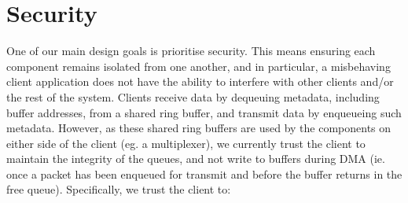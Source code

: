 \section{Security}
One of our main design goals is prioritise security. This means ensuring each component remains isolated from one another, and in particular, a
misbehaving client application does not have the ability to interfere with other clients and/or the rest of the system. Clients receive
data by dequeuing metadata, including buffer addresses, from a shared ring buffer, and transmit data by enqueueing such metadata. 
However, as these shared ring buffers are used by the components on either side of the client (eg. a multiplexer), we currently 
trust the client to maintain the integrity of the queues, and not write to buffers during DMA (ie. once a packet has been enqueued
for transmit and before the buffer returns in the free queue). Specifically, we trust the client to:
